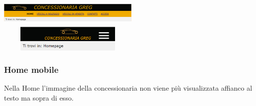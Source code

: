         \begin{center}
            \includegraphics[width=16pc, height=3pc]{./img/MenuDesktop.png} \includegraphics[width=16pc, height=3pc]{./img/MenuMobile.png}
        \end{center}

        \subsubsection{Home mobile}
        Nella Home l'immagine della concessionaria non viene più visualizzata affianco al testo ma sopra di esso.

